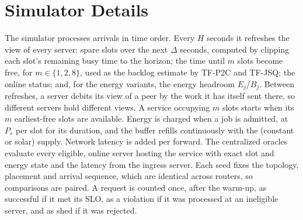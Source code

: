 \documentclass[journal]{IEEEtran}
\begin{document}
\section{Simulator Details}

The simulator processes arrivals in time order. Every \(H\) seconds it refreshes the view of every server: spare slots over the next \(\Delta\) seconds, computed by clipping each slot's remaining busy time to the horizon; the time until \(m\) slots become free, for \(m\in\{1,2,8\}\), used as the backlog estimate by TF-P2C and TF-JSQ; the online status; and, for the energy variants, the energy headroom \(E_j/B_j\). Between refreshes, a server debits its view of a peer by the work it has itself sent there, so different servers hold different views. A service occupying \(m\) slots starts when its \(m\) earliest-free slots are available. Energy is charged when a job is admitted, at \(P_s\) per slot for its duration, and the buffer refills continuously with the (constant or solar) supply. Network latency is added per forward. The centralized oracles evaluate every eligible, online server hosting the service with exact slot and energy state and the latency from the ingress server. Each seed fixes the topology, placement and arrival sequence, which are identical across routers, so comparisons are paired. A request is counted once, after the warm-up, as successful if it met its SLO, as a violation if it was processed at an ineligible server, and as shed if it was rejected.
\end{document}
